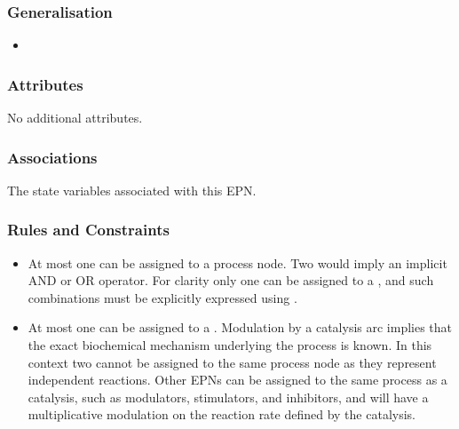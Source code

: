\subsubsection{Generalisation}

\begin{itemize}
\item {}
\end{itemize}

\subsubsection{Attributes}

No additional attributes.

\subsubsection{Associations}

\begin{attributes}
 The state variables
  associated with this EPN.
\end{attributes}

\subsubsection{Rules and Constraints}

\begin{itemize}
\item At most one  can be assigned to a process node. Two 
  would imply an implicit AND or OR operator. For clarity only
  one  can be assigned to a , and such combinations must be
  explicitly expressed using .
\item At most one  can be assigned to a
  . Modulation by a catalysis arc implies that the exact biochemical mechanism underlying
  the process is known. In this context two  cannot
  be assigned to the same process node as they represent
  independent reactions. Other EPNs can be assigned to the same process as a catalysis, such as modulators, stimulators, and
  inhibitors, and will have a multiplicative modulation on the
  reaction rate defined by the catalysis.
\end{itemize}

